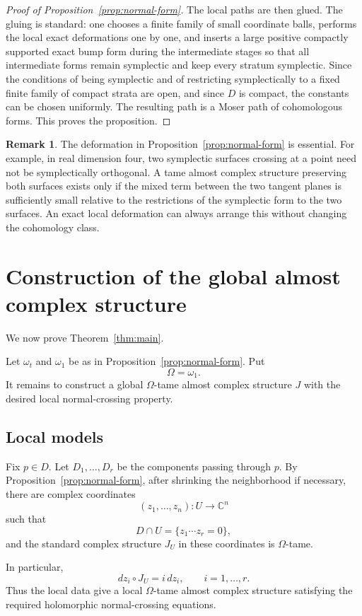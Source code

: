\documentclass{amsart}
\theoremstyle{definition}
\newtheorem{remark}{Remark}
\newcommand{\C}{\mathbb C}
\begin{document}
\begin{proof}[Proof of Proposition~\ref{prop:normal-form}]
The local paths are then glued. The gluing is standard: one chooses a finite family of
small coordinate balls, performs the local exact deformations one by one, and inserts a
large positive compactly supported exact bump form during the intermediate stages so that
all intermediate forms remain symplectic and keep every stratum symplectic. Since the
conditions of being symplectic and of restricting symplectically to a fixed finite family
of compact strata are open, and since $D$ is compact, the constants can be chosen
uniformly. The resulting path is a Moser path of cohomologous forms. This proves the
proposition.
\end{proof}

\begin{remark}
The deformation in Proposition~\ref{prop:normal-form} is essential. For example, in real
dimension four, two symplectic surfaces crossing at a point need not be symplectically
orthogonal. A tame almost complex structure preserving both surfaces exists only if the
mixed term between the two tangent planes is sufficiently small relative to the restrictions
of the symplectic form to the two surfaces. An exact local deformation can always arrange
this without changing the cohomology class.
\end{remark}

\section{Construction of the global almost complex structure}

We now prove Theorem~\ref{thm:main}.

Let $\omega_t$ and $\omega_1$ be as in Proposition~\ref{prop:normal-form}. Put
\[
\Omega=\omega_1 .
\]
It remains to construct a global $\Omega$-tame almost complex structure $J$ with the desired
local normal-crossing property.

\subsection{Local models}

Fix $p\in D$. Let $D_1,\dots,D_r$ be the components passing through $p$. By
Proposition~\ref{prop:normal-form}, after shrinking the neighborhood if necessary, there are
complex coordinates
\[
(z_1,\dots,z_n):U\to \C^n
\]
such that
\[
D\cap U=\{z_1\cdots z_r=0\},
\]
and the standard complex structure $J_U$ in these coordinates is $\Omega$-tame.

In particular,
\[
dz_i\circ J_U=i\,dz_i,\qquad i=1,\dots,r.
\]
Thus the local data give a local $\Omega$-tame almost complex structure satisfying the
required holomorphic normal-crossing equations.
\end{document}
